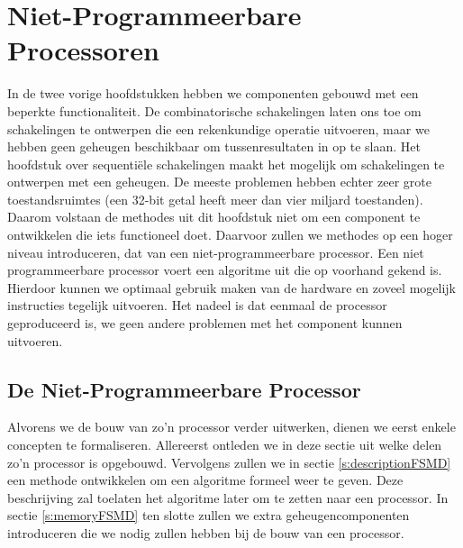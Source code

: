 \chapter{Niet-Programmeerbare Processoren}
\begin{chapterintro}
In de twee vorige hoofdstukken hebben we componenten gebouwd met een beperkte functionaliteit. De combinatorische schakelingen laten ons toe om schakelingen te ontwerpen die een rekenkundige operatie uitvoeren, maar we hebben geen geheugen beschikbaar om tussenresultaten in op te slaan. Het hoofdstuk over sequenti\"ele schakelingen maakt het mogelijk om schakelingen te ontwerpen met een geheugen. De meeste problemen hebben echter zeer grote toestandsruimtes (een 32-bit getal heeft meer dan vier miljard toestanden). Daarom volstaan de methodes uit dit hoofdstuk niet om een component te ontwikkelen die iets functioneel doet. Daarvoor zullen we methodes op een hoger niveau introduceren, dat van een niet-programmeerbare processor. Een niet programmeerbare processor voert een algoritme uit die op voorhand gekend is. Hierdoor kunnen we optimaal gebruik maken van de hardware en zoveel mogelijk instructies tegelijk uitvoeren. Het nadeel is dat eenmaal de processor geproduceerd is, we geen andere problemen met het component kunnen uitvoeren.
\end{chapterintro}
\minitoc[n]
\section{De Niet-Programmeerbare Processor}
Alvorens we de bouw van zo'n processor verder uitwerken, dienen we eerst enkele concepten te formaliseren. Allereerst ontleden we in deze sectie uit welke delen zo'n processor is opgebouwd. Vervolgens zullen we in sectie \ref{s:descriptionFSMD} een methode ontwikkelen om een algoritme formeel weer te geven. Deze beschrijving zal toelaten het algoritme later om te zetten naar een processor. In sectie \ref{s:memoryFSMD} ten slotte zullen we extra geheugencomponenten introduceren die we nodig zullen hebben bij de bouw van een processor.
